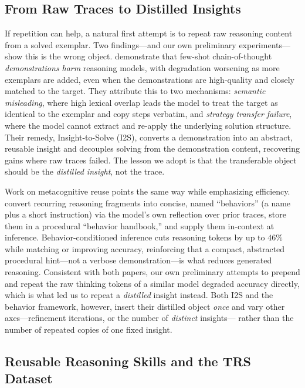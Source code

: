 \subsection{From Raw Traces to Distilled Insights}
\label{subsec:rw-distilled}

If repetition can help, a natural first attempt is to repeat raw reasoning content
from a solved exemplar. Two findings---and our own preliminary experiments---show
this is the wrong object. \citet{wang2025harm} demonstrate that few-shot
chain-of-thought \emph{demonstrations harm} reasoning models, with degradation
worsening as more exemplars are added, even when the demonstrations are high-quality
and closely matched to the target. They attribute this to two mechanisms:
\emph{semantic misleading}, where high lexical overlap leads the model to treat the
target as identical to the exemplar and copy steps verbatim, and \emph{strategy
transfer failure}, where the model cannot extract and re-apply the underlying
solution structure. Their remedy, Insight-to-Solve (I2S), converts a demonstration
into an abstract, reusable insight and decouples solving from the demonstration
content, recovering gains where raw traces failed. The lesson we adopt is that the
transferable object should be the \emph{distilled insight}, not the trace.

Work on metacognitive reuse points the same way while emphasizing efficiency.
\citet{didolkar2025metacognitive} convert recurring reasoning fragments into concise,
named ``behaviors'' (a name plus a short instruction) via the model's own reflection
over prior traces, store them in a procedural ``behavior handbook,'' and supply them
in-context at inference. Behavior-conditioned inference cuts reasoning tokens by up
to $46\%$ while matching or improving accuracy, reinforcing that a compact,
abstracted procedural hint---not a verbose demonstration---is what reduces generated
reasoning. Consistent with both papers, our own preliminary attempts to prepend and
repeat the raw thinking tokens of a similar model degraded accuracy directly, which
is what led us to repeat a \emph{distilled} insight instead. Both I2S and the
behavior framework, however, insert their distilled object \emph{once} and vary
other axes---refinement iterations, or the number of \emph{distinct} insights---
rather than the number of repeated copies of one fixed insight.

\subsection{Reusable Reasoning Skills and the TRS Dataset}
\label{subsec:rw-skills}

